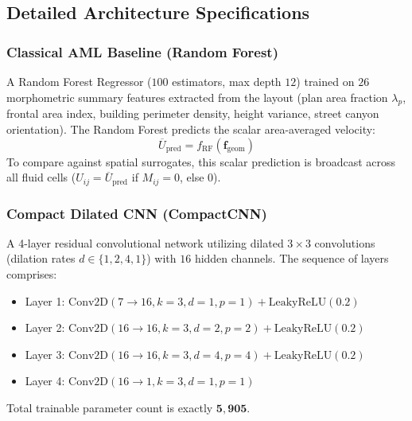 \documentclass[10pt,twocolumn]{article}
\begin{document}
\subsection{Detailed Architecture Specifications}
\subsubsection{Classical AML Baseline (Random Forest)}
A Random Forest Regressor ($100$ estimators, max depth $12$) trained on $26$ morphometric summary features extracted from the layout (plan area fraction $\lambda_p$, frontal area index, building perimeter density, height variance, street canyon orientation). The Random Forest predicts the scalar area-averaged velocity:
\begin{equation}
    \overline{U}_{\text{pred}} = f_{\text{RF}}(\mathbf{f}_{\text{geom}})
\end{equation}
To compare against spatial surrogates, this scalar prediction is broadcast across all fluid cells ($U_{ij} = \overline{U}_{\text{pred}}$ if $M_{ij} = 0$, else $0$).

\subsubsection{Compact Dilated CNN (CompactCNN)}
A 4-layer residual convolutional network utilizing dilated $3 \times 3$ convolutions (dilation rates $d \in \{1, 2, 4, 1\}$) with $16$ hidden channels. The sequence of layers comprises:
\begin{itemize}
    \item Layer 1: $\text{Conv2D}(7 \to 16, k=3, d=1, p=1) + \text{LeakyReLU}(0.2)$
    \item Layer 2: $\text{Conv2D}(16 \to 16, k=3, d=2, p=2) + \text{LeakyReLU}(0.2)$
    \item Layer 3: $\text{Conv2D}(16 \to 16, k=3, d=4, p=4) + \text{LeakyReLU}(0.2)$
    \item Layer 4: $\text{Conv2D}(16 \to 1, k=3, d=1, p=1)$
\end{itemize}
Total trainable parameter count is exactly $\mathbf{5,905}$.
\end{document}
